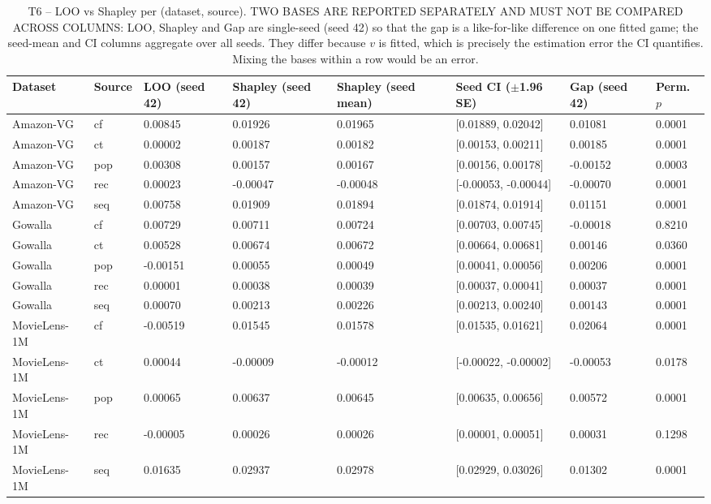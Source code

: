 \begin{table}[htbp]
\centering
\footnotesize
\caption{T6 -- LOO vs Shapley per (dataset, source). TWO BASES ARE REPORTED SEPARATELY AND MUST NOT BE COMPARED ACROSS COLUMNS: LOO, Shapley and Gap are single-seed (seed 42) so that the gap is a like-for-like difference on one fitted game; the seed-mean and CI columns aggregate over all seeds. They differ because $v$ is fitted, which is precisely the estimation error the CI quantifies. Mixing the bases within a row would be an error.}
\label{tab:T6_loo_vs_shapley}
\begin{tabular}{llllllll}
\toprule
Dataset & Source & LOO (seed 42) & Shapley (seed 42) & Shapley (seed mean) & Seed CI ($\pm$1.96 SE) & Gap (seed 42) & Perm. $p$ \\
\midrule
Amazon-VG & cf & 0.00845 & 0.01926 & 0.01965 & [0.01889, 0.02042] & 0.01081 & 0.0001 \\
Amazon-VG & ct & 0.00002 & 0.00187 & 0.00182 & [0.00153, 0.00211] & 0.00185 & 0.0001 \\
Amazon-VG & pop & 0.00308 & 0.00157 & 0.00167 & [0.00156, 0.00178] & -0.00152 & 0.0003 \\
Amazon-VG & rec & 0.00023 & -0.00047 & -0.00048 & [-0.00053, -0.00044] & -0.00070 & 0.0001 \\
Amazon-VG & seq & 0.00758 & 0.01909 & 0.01894 & [0.01874, 0.01914] & 0.01151 & 0.0001 \\
Gowalla & cf & 0.00729 & 0.00711 & 0.00724 & [0.00703, 0.00745] & -0.00018 & 0.8210 \\
Gowalla & ct & 0.00528 & 0.00674 & 0.00672 & [0.00664, 0.00681] & 0.00146 & 0.0360 \\
Gowalla & pop & -0.00151 & 0.00055 & 0.00049 & [0.00041, 0.00056] & 0.00206 & 0.0001 \\
Gowalla & rec & 0.00001 & 0.00038 & 0.00039 & [0.00037, 0.00041] & 0.00037 & 0.0001 \\
Gowalla & seq & 0.00070 & 0.00213 & 0.00226 & [0.00213, 0.00240] & 0.00143 & 0.0001 \\
MovieLens-1M & cf & -0.00519 & 0.01545 & 0.01578 & [0.01535, 0.01621] & 0.02064 & 0.0001 \\
MovieLens-1M & ct & 0.00044 & -0.00009 & -0.00012 & [-0.00022, -0.00002] & -0.00053 & 0.0178 \\
MovieLens-1M & pop & 0.00065 & 0.00637 & 0.00645 & [0.00635, 0.00656] & 0.00572 & 0.0001 \\
MovieLens-1M & rec & -0.00005 & 0.00026 & 0.00026 & [0.00001, 0.00051] & 0.00031 & 0.1298 \\
MovieLens-1M & seq & 0.01635 & 0.02937 & 0.02978 & [0.02929, 0.03026] & 0.01302 & 0.0001 \\
\bottomrule
\end{tabular}
\end{table}
